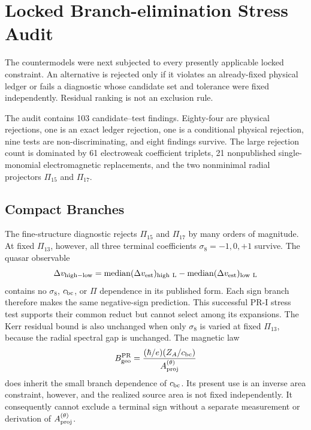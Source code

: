 \section{Locked Branch-elimination Stress Audit}
\label{app:branch-elimination}

The countermodels were next subjected to every presently applicable locked constraint.  An alternative is rejected only if it violates an already-fixed physical ledger or fails a diagnostic whose candidate set and tolerance were fixed independently.  Residual ranking is not an exclusion rule.

The audit contains 103 candidate--test findings.  Eighty-four are physical rejections, one is an exact ledger rejection, one is a conditional physical rejection, nine tests are non-discriminating, and eight findings survive.  The
large rejection count is dominated by 61 electroweak coefficient triplets, 21 nonpublished single-monomial electromagnetic replacements, and the two nonminimal radial projectors $\Pi_{15}$ and $\Pi_{17}$.

\subsection{Compact Branches}

The fine-structure diagnostic rejects $\Pi_{15}$ and $\Pi_{17}$ by many orders of magnitude.  At fixed $\Pi_{13}$, however, all three terminal coefficients $\sigma_8=-1,0,+1$ survive.  The quasar observable
\begin{equation}
 \Delta v_{\rm high-low}
 =\operatorname{median}(\Delta v_{\rm est})_{\rm high\ L}
 -\operatorname{median}(\Delta v_{\rm est})_{\rm low\ L}
 \label{eq:pr35-quasar-nondiscrimination}
\end{equation}
contains no $\sigma_8$, $c_{\rm bc}$, or $\Pi$ dependence in its published form.  Each sign branch therefore makes the same negative-sign prediction. This successful PR-I stress test supports their common reduct but cannot select among its expansions. The Kerr residual bound \cite{Kerr_1963} is also unchanged when only $\sigma_8$ is varied at fixed $\Pi_{13}$, because the radial spectral gap is unchanged.  The magnetic law
\begin{equation}
 B_{\rm geo}^{\rm PR}
 =\frac{(\hbar/e)(Z_A/c_{\rm bc})}{A_{\rm proj}^{(\theta)}}
 \label{eq:pr35-magnetic-nondiscrimination}
\end{equation}
does inherit the small branch dependence of $c_{\rm bc}$.  Its present use is an inverse area constraint, however, and the realized source area is not fixed independently.  It consequently cannot exclude a terminal sign without a separate measurement or derivation of $A_{\rm proj}^{(\theta)}$.

